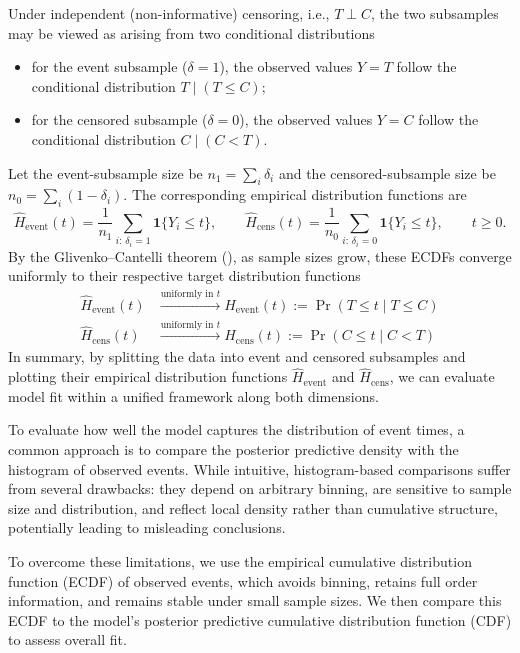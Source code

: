 Under independent (non-informative) censoring, i.e., $T\perp C$, the two subsamples may be viewed as arising from two conditional distributions
\begin{itemize}
    \item for the event subsample ($\delta=1$), the observed values $Y=T$ follow the conditional distribution $T\mid(T\le C)$;
    \item for the censored subsample ($\delta=0$), the observed values $Y=C$ follow the conditional distribution $C\mid(C<T)$.
\end{itemize}
Let the event-subsample size be $n_1=\sum_i \delta_i$ and the censored-subsample size be $n_0=\sum_i (1-\delta_i)$. The corresponding empirical distribution functions are
\begin{equation}
    \widehat H_{\text{event}}(t)
=\frac{1}{n_1}\sum_{i:\,\delta_i=1}\mathbf 1\{Y_i\le t\},\qquad
\widehat H_{\text{cens}}(t)
=\frac{1}{n_0}\sum_{i:\,\delta_i=0}\mathbf 1\{Y_i\le t\},\qquad t\ge 0.
\end{equation}
By the Glivenko–Cantelli theorem (\cite{tucker1959generalization}), as sample sizes grow, these ECDFs converge uniformly to their respective target distribution functions
\begin{align}
\widehat H_{\text{event}}(t) &\xrightarrow{\text{uniformly in } t} H_{\text{event}}(t) := \Pr(T \le t \mid T \le C) \\
\widehat H_{\text{cens}}(t) &\xrightarrow{\text{uniformly in } t} H_{\text{cens}}(t) := \Pr(C \le t \mid C < T)
\end{align}
In summary, by splitting the data into event and censored subsamples and plotting their empirical distribution functions $\widehat H_{\text{event}}$ and $\widehat H_{\text{cens}}$, we can evaluate model fit within a unified framework along both dimensions.





To evaluate how well the model captures the distribution of event times, a common approach is to compare the posterior predictive density with the histogram of observed events. While intuitive, histogram-based comparisons suffer from several drawbacks: they depend on arbitrary binning, are sensitive to sample size and distribution, and reflect local density rather than cumulative structure, potentially leading to misleading conclusions.

To overcome these limitations, we use the empirical cumulative distribution function (ECDF) of observed events, which avoids binning, retains full order information, and remains stable under small sample sizes. We then compare this ECDF to the model’s posterior predictive cumulative distribution function (CDF) to assess overall fit.

